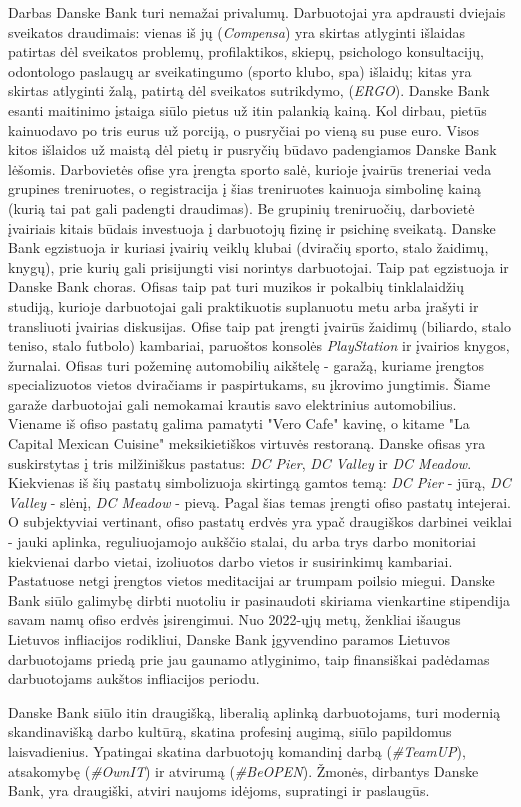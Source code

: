 \documentclass{VUMIFPSBakPrakAt}
\begin{document}
\par
Darbas Danske Bank turi nemažai privalumų. Darbuotojai yra apdrausti dviejais sveikatos draudimais: vienas iš jų (\textit{Compensa}) yra skirtas atlyginti išlaidas patirtas dėl sveikatos problemų, profilaktikos, skiepų, psichologo konsultacijų, odontologo paslaugų ar sveikatingumo (sporto klubo, spa) išlaidų; kitas yra skirtas atlyginti žalą, patirtą dėl sveikatos sutrikdymo, (\textit{ERGO}). Danske Bank esanti maitinimo įstaiga siūlo pietus už itin palankią kainą. Kol dirbau, pietūs kainuodavo po tris eurus už porciją, o pusryčiai po vieną su puse euro. Visos kitos išlaidos už maistą dėl pietų ir pusryčių būdavo padengiamos Danske Bank lėšomis. Darbovietės ofise yra įrengta sporto salė, kurioje įvairūs treneriai veda grupines treniruotes, o registracija į šias treniruotes kainuoja simbolinę kainą (kurią tai pat gali padengti draudimas). Be grupinių treniruočių, darbovietė įvairiais kitais būdais investuoja į darbuotojų fizinę ir psichinę sveikatą. Danske Bank egzistuoja ir kuriasi įvairių veiklų klubai (dviračių sporto, stalo žaidimų, knygų), prie kurių gali prisijungti visi norintys darbuotojai. Taip pat egzistuoja ir Danske Bank choras. Ofisas taip pat turi muzikos ir pokalbių tinklalaidžių studiją, kurioje darbuotojai gali praktikuotis suplanuotu metu arba įrašyti ir transliuoti įvairias diskusijas. Ofise taip pat įrengti įvairūs žaidimų (biliardo, stalo teniso, stalo futbolo) kambariai, paruoštos konsolės \textit{PlayStation} ir įvairios knygos, žurnalai. Ofisas turi požeminę automobilių aikštelę - garažą, kuriame įrengtos specializuotos vietos dviračiams ir paspirtukams, su įkrovimo jungtimis. Šiame garaže darbuotojai gali nemokamai krautis savo elektrinius automobilius. Viename iš ofiso pastatų galima pamatyti "Vero Cafe" kavinę, o kitame "La Capital Mexican Cuisine" meksikietiškos virtuvės restoraną. Danske ofisas yra suskirstytas į tris milžiniškus pastatus: \textit{DC Pier}, \textit{DC Valley} ir \textit{DC Meadow}. Kiekvienas iš šių pastatų simbolizuoja skirtingą gamtos temą: \textit{DC Pier} - jūrą, \textit{DC Valley} - slėnį, \textit{DC Meadow} - pievą. Pagal šias temas įrengti ofiso pastatų intejerai. O subjektyviai vertinant, ofiso pastatų erdvės yra ypač draugiškos darbinei veiklai - jauki aplinka, reguliuojamojo aukščio stalai, du arba trys darbo monitoriai kiekvienai darbo vietai, izoliuotos darbo vietos ir susirinkimų kambariai. Pastatuose netgi įrengtos vietos meditacijai ar trumpam poilsio miegui. Danske Bank siūlo galimybę dirbti nuotoliu ir pasinaudoti skiriama vienkartine stipendija savam namų ofiso erdvės įsirengimui. Nuo 2022-ųjų metų, ženkliai išaugus Lietuvos infliacijos rodikliui, Danske Bank įgyvendino paramos Lietuvos darbuotojams priedą prie jau gaunamo atlyginimo, taip finansiškai padėdamas darbuotojams aukštos infliacijos periodu.
\par
Danske Bank siūlo itin draugišką, liberalią aplinką darbuotojams, turi modernią skandinavišką darbo kultūrą, skatina profesinį augimą, siūlo papildomus laisvadienius. Ypatingai skatina darbuotojų komandinį darbą (\textit{\#TeamUP}), atsakomybę (\textit{\#OwnIT}) ir atvirumą (\textit{\#BeOPEN}). Žmonės, dirbantys Danske Bank, yra draugiški, atviri naujoms idėjoms, supratingi ir paslaugūs.
\end{document}
